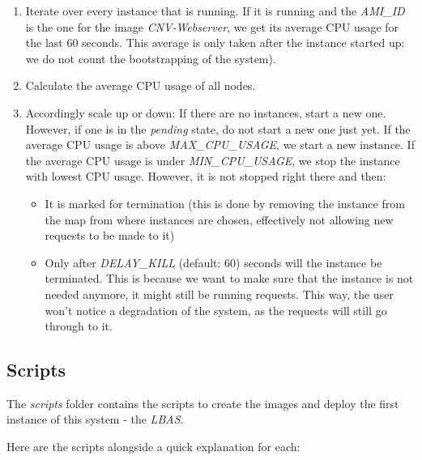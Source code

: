 \documentclass{article}
\begin{document}
\begin{enumerate}
    \item Iterate over every instance that is running. If it is running and the
        \textit{AMI\_ID} is the one for the image \textit{CNV-Webserver}, we get
        its average CPU usage for the last 60 seconds. This average is only
        taken after the instance started up: we do not count the bootstrapping
        of the system).
    \item Calculate the average CPU usage of all nodes.
    \item Accordingly scale up or down:
        \subitem If there are no instances, start a new one. However, if one is
        in the \textit{pending} state, do not start a new one just yet.
        \subitem If the average CPU usage is above \textit{MAX\_CPU\_USAGE}, we
        start a new instance.
        \subitem If the average CPU usage is under \textit{MIN\_CPU\_USAGE}, we
        stop the instance with lowest CPU usage. However, it is not stopped
        right there and then:
        \begin{itemize}
            \item It is marked for termination (this is done by removing the
                instance from the map from where instances are chosen,
                effectively not allowing new requests to be made to it)
            \item Only after \textit{DELAY\_KILL} (default: 60) seconds will the
                instance be terminated. This is because we want to make sure
                that the instance is not needed anymore, it might still be
                running requests. This way, the user won't notice a degradation
                of the system, as the requests will still go through to it.
        \end{itemize}
\end{enumerate}

\subsection{Scripts}

The \textit{scripts} folder contains the scripts to create the images and deploy
the first instance of this system - the \textit{LBAS}.

Here are the scripts alongside a quick explanation for each:
\end{document}
